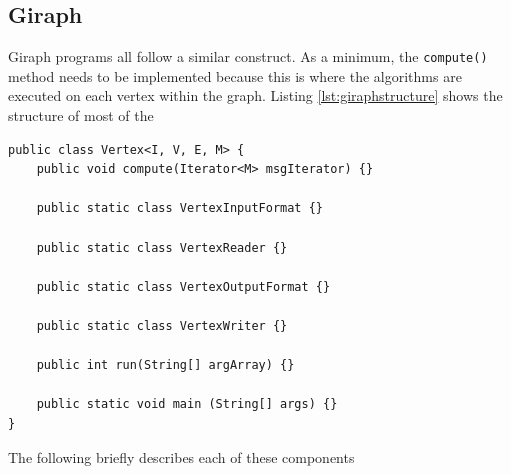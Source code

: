 \subsection{Giraph}
Giraph programs all follow a similar construct. As a minimum, the \verb/compute()/ method needs to be implemented because this is where the algorithms are executed on each vertex within the graph. Listing \ref{lst:giraphstructure} shows the structure of most of the 

\begin{lstlisting}[float]
public class Vertex<I, V, E, M> {
	public void compute(Iterator<M> msgIterator) {}
	
	public static class VertexInputFormat {}
	
	public static class VertexReader {}
	
	public static class VertexOutputFormat {}
	
	public static class VertexWriter {}
	
	public int run(String[] argArray) {}
	
	public static void main (String[] args) {}
}						
\end{lstlisting}

The following briefly describes each of these components


